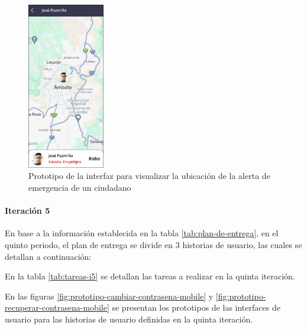 \begin{figure}[H]
      \centering
      \includegraphics[width=0.3\textwidth]{chapters/III-resultados-y-discusion/resources/images/prototipo-ubicacion-alerta-policia.png}
      \caption{Prototipo de la interfaz para visualizar la ubicación de la alerta de emergencia de un ciudadano}
      \label{fig:prototipo-ubicacion-alerta-policia}
\end{figure}

\paragraph{Iteración 5}

En base a la información establecida en la tabla \ref{tab:plan-de-entrega}, en el quinto periodo, el plan de
entrega se divide en 3 historias de usuario, las cuales se detallan a continuación:



En la tabla \ref{tab:tareas-i5} se detallan las tareas a realizar en la quinta iteración.



En las figuras \ref{fig:prototipo-cambiar-contrasena-mobile} y \ref{fig:prototipo-recuperar-contrasena-mobile} se presentan
los prototipos de las interfaces de usuario para las historias de usuario definidas en la quinta iteración.


